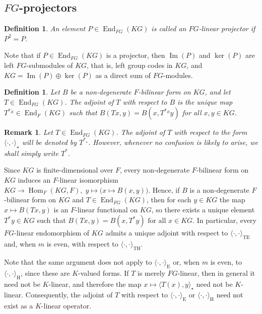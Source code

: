 \documentclass[11pt]{article}
\newtheorem{remark}[theorem]{Remark}
\newtheorem{definition}[theorem]{Definition}
\begin{document}
\subsection{$FG$-projectors}
\begin{definition}
An element $P\in \operatorname{End}_{FG}(KG)$ is called an \emph{$FG$-linear projector} if
$
P^2=P.
$

\end{definition}
Note that if $P\in \operatorname{End}_{FG}(KG)$ is a projector, then $\operatorname{Im}(P)$ and $\ker(P)$ are left $FG$-submodules of $KG$, that is, left group codes in $KG$, and
$
KG=\operatorname{Im}(P)\oplus\ker(P)
$
as a direct sum of $FG$-modules.

\begin{definition}
Let $B$ be a non-degenerate $F$-bilinear form on $KG$, and let $T\in \operatorname{End}_{FG}(KG)$. The \emph{adjoint} of $T$ with respect to $B$ is the unique map $T^{\ast_B}\in \operatorname{End}_{F}(KG)$ such that $B(Tx,y)=B(x,T^{\ast_B} y)$ for all $x,y\in KG$.
\end{definition}
\begin{remark}\label{adjunto-E-TE}
Let $T\in \operatorname{End}_{FG}(KG)$. The adjoint of $T$ with respect to the form $\langle\cdot,\cdot\rangle_\star$ will be denoted by $T^{\ast_\star}$. However, whenever no confusion is likely to arise, we shall simply write $T^\ast$.
\end{remark}
Since $KG$ is finite-dimensional over $F$, every non-degenerate $F$-bilinear form on $KG$ induces an $F$-linear isomorphism
$
KG \longrightarrow \operatorname{Hom}_F(KG,F), \;y\longmapsto \bigl(x\mapsto B(x,y)\bigr).
$
Hence, if $B$ is a non-degenerate $F$-bilinear form on $KG$ and $T\in \operatorname{End}_{FG}(KG)$, then for each $y\in KG$ the map $x\mapsto B(Tx,y)$ is an $F$-linear functional on $KG$, so there exists a unique element $T^\ast y\in KG$ such that
$
B(Tx,y)=B(x,T^\ast y)\text{ for all }x\in KG.
$
In particular, every $FG$-linear endomorphism of $KG$ admits a unique adjoint with respect to $\langle\cdot,\cdot\rangle_{\mathrm{TE}}$ and, when $m$ is even, with respect to $\langle\cdot,\cdot\rangle_{\mathrm{TH}}$.



Note that the same argument does not apply to $\langle\cdot,\cdot\rangle_{\mathrm{E}}$ or, when $m$ is even, to $\langle\cdot,\cdot\rangle_{\mathrm{H}}$, since these are $K$-valued forms. If $T$ is merely $FG$-linear, then in general it need not be $K$-linear, and therefore the map $x\mapsto \langle T(x),y\rangle_\star$ need not be $K$-linear. Consequently, the adjoint of $T$ with respect to $\langle\cdot,\cdot\rangle_{\mathrm{E}}$ or $\langle\cdot,\cdot\rangle_{\mathrm{H}}$ need not exist as a $K$-linear operator.
\end{document}
